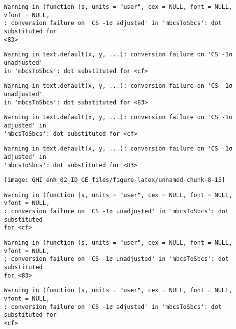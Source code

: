 \documentclass[
  10pt,
  a4paper,oneside]{article}
\begin{document}
\begin{verbatim}
Warning in (function (s, units = "user", cex = NULL, font = NULL, vfont = NULL,
: conversion failure on 'CS -1σ adjusted' in 'mbcsToSbcs': dot substituted for
<83>
\end{verbatim}

\begin{verbatim}
Warning in text.default(x, y, ...): conversion failure on 'CS -1σ unadjusted'
in 'mbcsToSbcs': dot substituted for <cf>
\end{verbatim}

\begin{verbatim}
Warning in text.default(x, y, ...): conversion failure on 'CS -1σ unadjusted'
in 'mbcsToSbcs': dot substituted for <83>
\end{verbatim}

\begin{verbatim}
Warning in text.default(x, y, ...): conversion failure on 'CS -1σ adjusted' in
'mbcsToSbcs': dot substituted for <cf>
\end{verbatim}

\begin{verbatim}
Warning in text.default(x, y, ...): conversion failure on 'CS -1σ adjusted' in
'mbcsToSbcs': dot substituted for <83>
\end{verbatim}

\begin{center}\texttt{[image: GHI\_enh\_02\_ID\_CE\_files/figure-latex/unnamed-chunk-8-15]} \end{center}

\begin{verbatim}
Warning in (function (s, units = "user", cex = NULL, font = NULL, vfont = NULL,
: conversion failure on 'CS -1σ unadjusted' in 'mbcsToSbcs': dot substituted
for <cf>
\end{verbatim}

\begin{verbatim}
Warning in (function (s, units = "user", cex = NULL, font = NULL, vfont = NULL,
: conversion failure on 'CS -1σ unadjusted' in 'mbcsToSbcs': dot substituted
for <83>
\end{verbatim}

\begin{verbatim}
Warning in (function (s, units = "user", cex = NULL, font = NULL, vfont = NULL,
: conversion failure on 'CS -1σ adjusted' in 'mbcsToSbcs': dot substituted for
<cf>
\end{verbatim}
\end{document}
